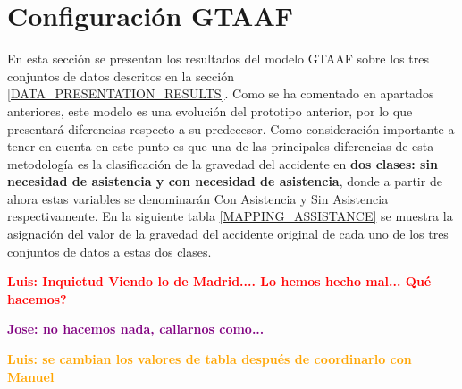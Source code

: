 \section{Configuración GTAAF}


En esta sección se presentan los resultados del modelo GTAAF sobre los tres conjuntos de datos descritos en la sección \ref{DATA_PRESENTATION_RESULTS}. Como se ha comentado en apartados anteriores, este modelo es una evolución del prototipo anterior, por lo que presentará diferencias respecto a su predecesor. Como consideración importante a tener en cuenta en este punto es que una de las principales diferencias de esta metodología es la clasificación de la gravedad del accidente en \textbf{dos clases: sin necesidad de asistencia y con necesidad de asistencia}, donde a partir de ahora estas variables se denominarán Con Asistencia y Sin Asistencia respectivamente. En la siguiente tabla \ref{MAPPING_ASSISTANCE} se muestra la asignación del valor de la gravedad del accidente original de cada uno de los tres conjuntos de datos a estas dos clases.

\textcolor{red}{\textbf{Luis: Inquietud Viendo lo de Madrid.... Lo hemos hecho mal... Qué hacemos?}}

\textcolor{purple}{\textbf{Jose: no hacemos nada, callarnos como...}}

\textcolor{orange}{\textbf{Luis: se cambian los valores de tabla después de coordinarlo con Manuel}}

